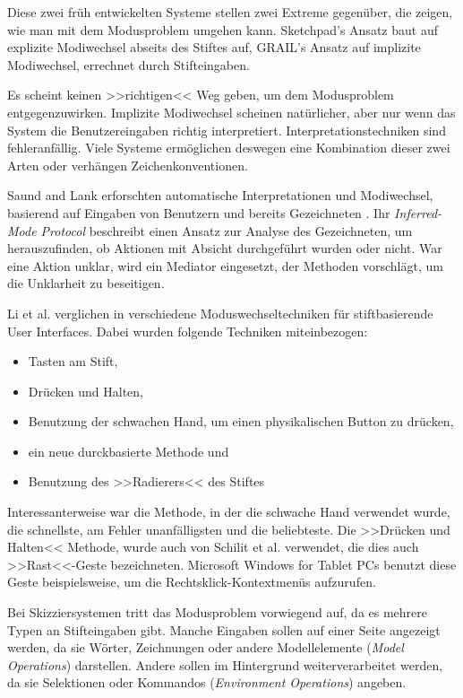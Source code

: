 \medskip Diese zwei früh entwickelten Systeme stellen zwei Extreme gegenüber, die zeigen, wie man mit dem Modusproblem umgehen kann. Sketchpad's Ansatz baut auf explizite Modiwechsel abseits des Stiftes auf, GRAIL's Ansatz auf implizite Modiwechsel, errechnet durch Stifteingaben.

\medskip Es scheint keinen >>richtigen<< Weg geben, um dem Modusproblem entgegenzuwirken. Implizite Modiwechsel scheinen natürlicher, aber nur wenn das System die Benutzereingaben richtig interpretiert. Interpretationstechniken sind fehleranfällig. Viele Systeme ermöglichen deswegen eine Kombination dieser zwei Arten oder verhängen Zeichenkonventionen.

\medskip Saund and Lank erforschten automatische Interpretationen und Modiwechsel, basierend auf Eingaben von Benutzern und bereits Gezeichneten \citep{Saund:2003p66}. Ihr \emph{Inferred-Mode Protocol} beschreibt einen Ansatz zur Analyse des Gezeichneten, um herauszufinden, ob Aktionen mit Absicht durchgeführt wurden oder nicht. War eine Aktion unklar, wird ein Mediator eingesetzt, der Methoden vorschlägt, um die Unklarheit zu beseitigen.

\medskip Li et al. verglichen in \citep{Li:2005} verschiedene Moduswechseltechniken für stiftbasierende User Interfaces. Dabei wurden folgende Techniken miteinbezogen: 
\begin{itemize}
	\item Tasten am Stift,
	\item Drücken und Halten,
	\item Benutzung der schwachen Hand, um einen physikalischen Button zu drücken,
	\item ein neue durckbasierte Methode und
	\item Benutzung des >>Radierers<< des Stiftes
\end{itemize}

Interessanterweise war die Methode, in der die schwache Hand verwendet wurde, die schnellste, am Fehler unanfälligsten und die beliebteste. Die >>Drücken und Halten<< Methode, wurde auch von Schilit et al. \citep{Schilit:1998} verwendet, die dies auch >>Rast<<-Geste bezeichneten. Microsoft Windows for Tablet PCs benutzt diese Geste beispielsweise, um die Rechtsklick-Kontextmenüs aufzurufen.

\medskip Bei Skizziersystemen tritt das Modusproblem vorwiegend auf, da es mehrere Typen an Stifteingaben gibt. Manche Eingaben sollen auf einer Seite angezeigt werden, da sie Wörter, Zeichnungen oder andere Modellelemente (\emph{Model Operations}) darstellen. Andere sollen im Hintergrund weiterverarbeitet werden, da sie Selektionen oder Kommandos (\emph{Environment Operations}) angeben.

